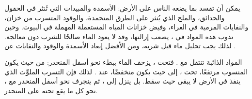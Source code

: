 يمكن أن تفسد  بما يضعه الناس على الأرض: الأسمدة
والمبيدات التي تُنثر في الحقول والحدائق، والملح الذي يُنثر على الطرق المتجمدة، والوقود
المتسرب من خزان، والنفايات المرمية في العراء، وفيض
خزانات المياه المستعملة المهملة في البيوت. وحين تذوب هذه المواد في ،
يصعب إزالتها، وقد لا يعود الماء صالحًا للشرب دون
معالجة. لذلك يجب تحليل ماء  قبل شربه، ومن الأفضل إبعاد الأسمدة والوقود والنفايات عن  .

المواد الذائبة تنتقل مع . فتحت ،
يزحف الماء ببطء نحو أسفل المنحدر: من حيث يكون المنسوب مرتفعًا، تحت
، إلى حيث يكون منخفضًا، عند  . لذلك فإن التسرب الملوِّث
الذي ينفذ في الأرض لا يبقى حيث سقط. بل ينزل إلى ، ثم ينجرف نحو أسفل المنحدر مع ، نحو كل ما يقع
تحته على المنحدر.

